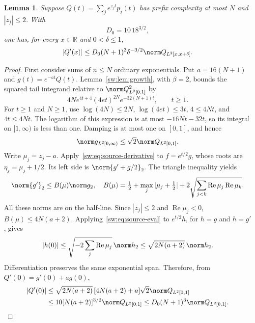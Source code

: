 \documentclass[11pt,a4paper]{article}
\numberwithin{equation}{section}
\newtheorem{lemma}[theorem]{Lemma}
\theoremstyle{definition}\newtheorem{definition}[theorem]{Definition}
\theoremstyle{remark}\newtheorem{remark}[theorem]{Remark}
\newcommand{\R}{\mathbb R}\newcommand{\C}{\mathbb C}\newcommand{\N}{\mathbb N}
\DeclareMathOperator{\Rea}{Re}\DeclareMathOperator{\Ima}{Im}
\begin{document}
\begin{lemma}\label{sw:lem:local-derivative}
Suppose $Q(t)=\sum_j e^{z_jt}p_j(t)$ has prefix complexity at most $N$ and $|z_j|\le2$. With
\begin{equation}\label{sw:eq:D0}
 D_0=10\,18^{3/2},
\end{equation}
one has, for every $x\in\R$ and $0<\delta\le1$,
\begin{equation}\label{sw:eq:local-derivative}
 |Q'(x)|\le D_0(N+1)^3\delta^{-3/2}
                            \norm Q_{L^2[x,x+\delta]}.
\end{equation}
\end{lemma}
\begin{proof}
First consider sums of $n\le N$ ordinary exponentials. Put $a=16(N+1)$ and $g(t)=e^{-at}Q(t)$. Lemma~\ref{sw:lem:growth}, with $\beta=2$, bounds the squared tail integrand relative to $\norm Q_{L^2[0,1]}^2$ by
\[
 4N e^{4t+4}(4et)^{2N}e^{-32(N+1)t},\qquad t\ge1.
\]
For $t\ge1$ and $N\ge1$, use
$\log(4N)\le2N$, $\log(4et)\le3t$, $4\le4Nt$, and $4t\le4Nt$.
The logarithm of this expression is at most $-16Nt-32t$, so its integral on $[1,\infty)$ is less than one. Damping is at most one on $[0,1]$, and hence
\begin{equation}\label{sw:eq:damped-norm}
 \norm g_{L^2[0,\infty)}\le\sqrt2\norm Q_{L^2[0,1]}.
\end{equation}
Write $\mu_j=z_j-a$. Apply~\eqref{sw:eq:source-derivative} to $f=e^{t/2}g$, whose roots are $\eta_j=\mu_j+1/2$. Its left side is $\norm{g'+g/2}_2$. The triangle inequality yields
\begin{equation}\label{sw:eq:Bmu}
 \norm{g'}_2\le B(\mu)\norm g_2,
 \quad B(\mu)=\tfrac12+\max_j|\mu_j+\tfrac12|
                +2\sqrt{\sum_{j<k}\Rea\mu_j\Rea\mu_k}.
\end{equation}
All these norms are on the half-line. Since $|z_j|\le2$ and $\Rea\mu_j<0$,
$B(\mu)\le4N(a+2)$. Applying~\eqref{sw:eq:source-eval} to $e^{t/2}h$, for $h=g$ and $h=g'$, gives
\begin{equation}\label{sw:eq:endpoint}
 |h(0)|\le\sqrt{-2\sum_j\Rea\mu_j}\,\norm h_2
          \le\sqrt{2N(a+2)}\,\norm h_2.
\end{equation}
Differentiation preserves the same exponential span. Therefore, from $Q'(0)=g'(0)+ag(0)$,
\begin{align*}
 |Q'(0)|
 &\le\sqrt{2N(a+2)}\,[4N(a+2)+a]\sqrt2\norm Q_{L^2[0,1]}\\
 &\le10[N(a+2)]^{3/2}\norm Q_{L^2[0,1]}
 \le D_0(N+1)^3\norm Q_{L^2[0,1]}.
\end{align*}


\end{proof}
\end{document}
